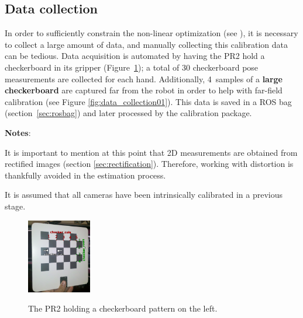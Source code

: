 \subsection{Data collection}

In order to sufficiently constrain the non-linear optimization (see \cite{pr2_calibration_paper}), it is necessary to collect a large amount of data, and manually collecting this calibration data can be tedious. Data acquisition is automated by having the PR2 hold a checkerboard in its gripper (Figure~\ref{fig:pr2_holdind_cb}); a total of 30 checkerboard pose measurements are collected for each hand. Additionally, 4~samples of a \textbf{large checkerboard} are captured far from the robot in order to help with far-field calibration (see Figure \ref{fig:data_collection01}). This data is saved in a ROS bag (section~\ref{sec:rosbag}) and later processed by the calibration package.

\noindent

\textbf{Notes}:
\begin{itemize*}
  \item It is important to mention at this point that 2D measurements are obtained from rectified images (section \ref{sec:rectification}). Therefore, working with distortion is thankfully avoided in the estimation process.
  \item It is assumed that all cameras have been intrinsically calibrated in a previous stage.
\end{itemize*}


\begin{figure}[!htbp]
  \centering
  \subfigure
  {
    \includegraphics[width=0.25\textwidth]{images/checkerboard01.png}
  }
  \caption{The PR2 holding a checkerboard pattern on the left.}
 \label{fig:pr2_holdind_cb}
\end{figure}


